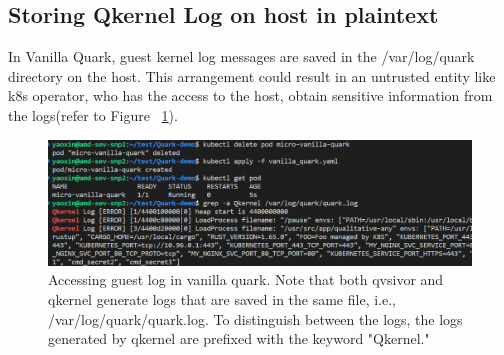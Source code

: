 \subsection{Storing Qkernel Log on host in plaintext}
In Vanilla Quark, guest kernel log messages are saved in the /var/log/quark directory on the host.  This arrangement could result in an untrusted entity like k8s operator, who has the access to the host,  obtain sensitive information from the logs(refer to Figure ~\ref{fig:vanilla_qkernel_Log}).
\begin{figure}[H]
    \centering
    \includegraphics[width=1\textwidth]{images/vanilla_qkernel_Log.png}
    \caption[Accessing guest kernel log in vanilla quark]{Accessing guest log in vanilla quark. Note that both qvsivor and qkernel generate logs that are saved in the same file, i.e., /var/log/quark/quark.log. To distinguish between the logs, the logs generated by qkernel are prefixed with the keyword "Qkernel."}
    \label{fig:vanilla_qkernel_Log}
\end{figure}


